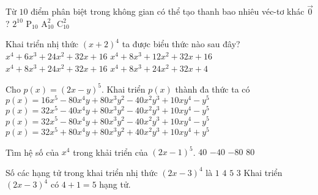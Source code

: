 \begin{ex}%
	Từ $10$ điểm phân biệt trong không gian có thể tạo thanh bao nhiêu véc-tơ khác $\vec{0}$?	
	\choice
	{$2^{10}$}
	{$\mathrm{P}_{10}$}
	{\True $\mathrm{A}^2_{10}$}
	{$\mathrm{C}^2_{10}$}
\end{ex}
\begin{ex}%
	Khai triển nhị thức $(x+2)^4$ ta được biểu thức nào sau đây?
	\choice
	{$x^4+6x^3+24x^2+32x+16$}
	{$x^4+8x^3+12x^2+32x+16$}
	{\True $x^4+8x^3+24x^2+32x+16$}
	{$x^4+8x^3+24x^2+32x+4$}
\end{ex}


\begin{ex}%
	Cho $p(x)=(2x-y)^5$. Khai triển $p(x)$ thành đa thức ta có
	\choice
	{$p(x)=16x^5-80x^4y+80x^3y^2-40x^2y^3+10xy^4-y^5$}
	{$p(x)=32x^5-40x^4y+80x^3y^2-40x^2y^3+10xy^4-y^5$}
	{\True $p(x)=32x^5-80x^4y+80x^3y^2-40x^2y^3+10xy^4-y^5$}
	{$p(x)=32x^5+80x^4y+80x^3y^2+40x^2y^3+10xy^4+y^5$}
\end{ex}



\begin{ex}%
	Tìm hệ số của $x^4$ trong khải triển của $(2x-1)^5$.
	\choice
	{$40$}
	{$-40$}
	{\True $-80$}
	{$80$}
\end{ex}

\begin{ex}%
	Số các hạng tử trong khai triển nhị thức $(2x-3)^4 $ là
	\choice
	{$1$}
	{$4$}
	{\True $5$}
	{$3$}
	\loigiai
	{Khai triển $(2x-3)^4 $ có $ 4+1=5 $ hạng tử.}
\end{ex}

